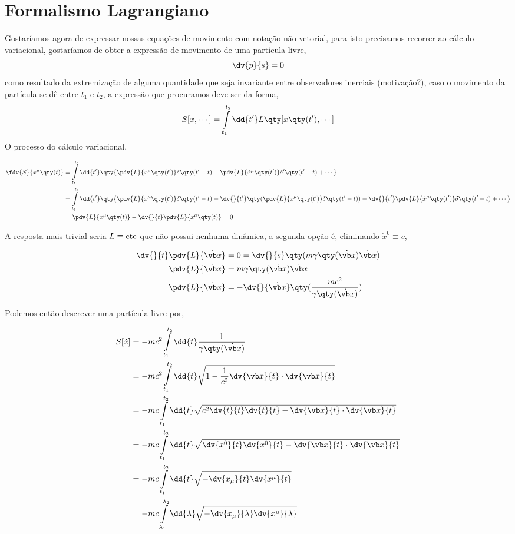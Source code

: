 \documentclass[twoside]{amsart}
\numberwithin{equation}{section}
\begin{document}
\section{Formalismo Lagrangiano}

Gostaríamos agora de expressar nossas equações de movimento com notação não vetorial, para isto precisamos recorrer ao cálculo variacional, gostaríamos de obter a expressão de movimento de uma partícula livre, $$\dv{p}{s}=0$$ como resultado da extremização de alguma quantidade que seja invariante entre observadores inerciais (motivação?), caso o movimento da partícula se dê entre $t_1$ e $t_2$, a expressão que procuramos deve ser da forma, $$S[x,\cdots]=\int\limits_{t_1}^{t_2}\dd{t'}L\qty[x\qty(t'),\cdots]$$ O processo do cálculo variacional,

\begin{align}
    \fdv{S}{x^\mu\qty(t)}&=\int\limits_{t_1}^{t_2}\dd{t'}\qty{\pdv{L}{x^\mu\qty(t')}\delta\qty(t'-t)+\pdv{L}{{\dot x}^\mu\qty(t')}\delta'\qty(t'-t)+\cdots}\\
    &=\int\limits_{t_1}^{t_2}\dd{t'}\qty{\pdv{L}{x^\mu\qty(t')}\delta\qty(t'-t)+\dv{}{t'}\qty(\pdv{L}{{\dot x}^\mu\qty(t')}\delta\qty(t'-t))-\dv{}{t'}\pdv{L}{{\dot x}^\mu\qty(t')}\delta\qty(t'-t)+\cdots}\\
    &=\pdv{L}{x^\mu\qty(t)}-\dv{}{t}\pdv{L}{{\dot x}^\mu\qty(t)}=0
\end{align}

A resposta mais trivial seria $L\equiv \textup{cte}$ que não possui nenhuma dinâmica, a segunda opção é, eliminando ${\dot x}^0\equiv c$,

\begin{align}
    \dv{}{t}\pdv{L}{\dot{\vb x}}&=0=\dv{}{s}\qty(m\gamma\qty(\dot{\vb x})\dot{\vb x})\\
    \pdv{L}{\dot{\vb x}}&=m\gamma\qty(\dot {\vb x})\dot{\vb x}\\
    \pdv{L}{\dot{\vb x}}&=-\dv{}{\dot{\vb x}}\qty(\frac{mc^2}{\gamma\qty(\dot{\vb x})})
\end{align}

Podemos então descrever uma partícula livre por,

\begin{align}
    S[\dot x]&=-mc^2\int\limits_{t_1}^{t_2}\dd{t}\frac{1}{\gamma\qty(\dot{\vb x})}\\
    &=-mc^2\int\limits_{t_1}^{t_2}\dd{t}\sqrt{1-\frac{1}{c^2}\dv{\vb x}{t}\cdot\dv{\vb x}{t}}\\
    &=-mc\int\limits_{t_1}^{t_2}\dd{t}\sqrt{c^2\dv{t}{t}\dv{t}{t}-\dv{\vb x}{t}\cdot\dv{\vb x}{t}}\\
    &=-mc\int\limits_{t_1}^{t_2}\dd{t}\sqrt{\dv{x^0}{t}\dv{x^0}{t}-\dv{\vb x}{t}\cdot\dv{\vb x}{t}}\\
    &=-mc\int\limits_{t_1}^{t_2}\dd{t}\sqrt{-\dv{x_\mu}{t}\dv{x^\mu}{t}}\\
    &=-mc\int\limits_{\lambda_1}^{\lambda_2}\dd{\lambda}\sqrt{-\dv{x_\mu}{\lambda}\dv{x^\mu}{\lambda}}
\end{align}
\end{document}

